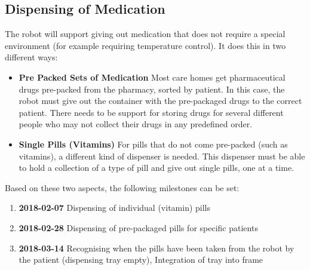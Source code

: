 \documentclass[a4paper,10pt,DIV10,openright,openbib]{scrreprt}
\begin{document}
\subsection{Dispensing of Medication}
The robot will support giving out medication that does not require a special environment
(for example requiring temperature control). It does this in two different ways:
\begin{itemize}
  \item \textbf{Pre Packed Sets of Medication} Most care homes get pharmaceutical drugs
pre-packed from the pharmacy, sorted by patient. In this case, the robot must
give out the container with the pre-packaged drugs to the correct patient. There
needs to be support for storing drugs for several different people who may not
collect their drugs in any predefined order.
  \item \textbf{Single Pills (Vitamins)} For pills that do not come pre-packed
(such as vitamins), a different kind of dispenser is needed. This dispenser must be able to hold a collection 
of a type of pill and give out single pills, one at a time.
\end{itemize}
Based on these two aspects, the following milestones can be set:
\begin{enumerate}
  \item \textbf{2018-02-07} Dispensing of individual (vitamin) pills
  \item \textbf{2018-02-28} Dispensing of pre-packaged pills for specific
    patients
\cbstart
  \item \textbf{2018-03-14} Recognising when the pills have been taken from the robot by the patient
    (dispensing tray empty), Integration of tray into frame
\cbend
\end{enumerate}
\end{document}
